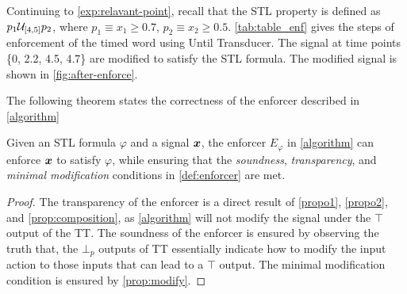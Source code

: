   \begin{example}\label{exp:alg2}
      Continuing to \cref{exp:relavant-point}, recall that the STL property is defined as $p_1\until_{[4,5]} p_2$, where $p_1\equiv x_1\ge 0.7$, $p_2\equiv x_2 \ge 0.5$. %
      \cref{tab:table_enf} gives the steps of enforcement of the timed word using Until Transducer. The signal at time points \{0, 2.2, 4.5, 4.7\} are modified to satisfy the STL formula. The modified signal is shown in \cref{fig:after-enforce}.
    \qedT
    \end{example}

    The following theorem states the correctness of the enforcer described in \cref{algorithm}
    \begin{theorem}
        Given an STL formula $\varphi$ and a signal $\bm{x}$, the enforcer $E_\varphi$ in \cref{algorithm} can enforce $\bm{x}$ to satisfy $\varphi$, while ensuring that the \emph{soundness}, \emph{transparency}, and \emph{minimal modification} conditions in \cref{def:enforcer} are met. 
    \end{theorem}
    \begin{proof}
    The transparency of the enforcer is a direct result of \cref{propo1}, \cref{propo2}, and \cref{prop:composition}, as \cref{algorithm} will not modify the signal under the $\top$ output of the TT. The soundness of the enforcer is ensured by observing the truth that, the $\bot_p$ outputs of TT essentially indicate how to modify the input action to those inputs that can lead to a $\top$ output. The minimal modification condition is ensured by \cref{prop:modify}.
    \end{proof}


